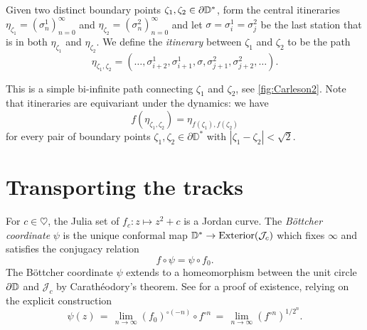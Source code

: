 \begin{definition}
\label{def-disk-itinerary}
Given two distinct boundary points $\zeta_{1},\zeta_{2}\in\partial\mathbb{D}^*$, form the central itineraries $\eta_{\zeta_{1}}= (\sigma_{n}^{1} )_{n=0}^{\infty}$ and $\eta_{\zeta_{2}}= (\sigma_{n}^{2} )_{n=0}^{\infty}$ and let  $\sigma=\sigma^1_i=\sigma^2_j$ be the last station that is in both $\eta_{\zeta_{1}}$ and $\eta_{\zeta_{2}}$.  
	 We define the \emph{itinerary} between  $\zeta_{1}$ and $\zeta_{2}$ to be the path 
$$
 \eta_{\zeta_{1},\zeta_{2}}=   (\dots,\sigma_{i+2}^{1},\sigma_{i+1}^{1},\sigma,\sigma_{j+1}^{2},\sigma_{j+2}^{2},\dots ).
$$

	This is a simple bi-infinite path connecting $\zeta_{1}$ and $\zeta_{2}$, see \cref{fig:Carleson2}. Note that itineraries are equivariant under the dynamics: we have  \begin{equation}
		f(\eta_{\zeta_1,\zeta_2})=\eta_{f(\zeta_1),f(\zeta_2)}
	\end{equation} for every pair of boundary points $\zeta_1,\zeta_2 \in \partial \mathbb D^*$ with $|\zeta_1-\zeta_2| < \sqrt{2}$. 
\end{definition}


\section{Transporting the tracks} \label{rails-section}
For $c \in \heartsuit$, the Julia set of $f_c: z\mapsto z^2+c$ is a Jordan curve. The {\em Böttcher coordinate} $\psi$ is the unique conformal map $\mathbb{D}^{*}\to\operatorname{Exterior}(\mathcal{J}_c)$  which fixes $\infty$ and satisfies the conjugacy relation 
$$
f\circ\psi=\psi\circ f_{0}.
$$
The Böttcher coordinate $\psi$ extends to a homeomorphism between the unit circle $\partial\mathbb{D}$ and $\mathcal{J}_c$ by Carathéodory's
theorem. See \cite[Theorem 9.5]{milnor_book} for a proof of existence, 
relying on the explicit construction 
\begin{equation}
	\psi(z) \, = \, \lim_{n\to \infty} (f_0)^{\circ (-n)} \circ f^{\circ n}\, = \, \lim_{n\to \infty} {(f^{\circ n})}^{1/2^n}.	
\end{equation}



